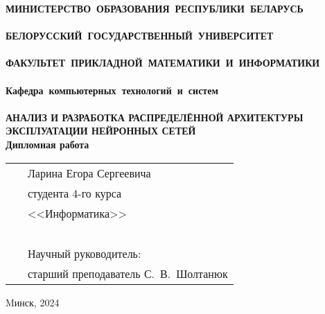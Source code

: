 \setcounter{page}{1}
\thispagestyle{empty}
\begin{center}
\bf
\vspace{4cm}
{
\mbox{МИНИСТЕРСТВО~ОБРАЗОВАНИЯ~РЕСПУБЛИКИ~БЕЛАРУСЬ} \\~\\
\mbox{БЕЛОРУССКИЙ~ГОСУДАРСТВЕННЫЙ~УНИВЕРСИТЕТ} \\~\\
\mbox{ФАКУЛЬТЕТ~ПРИКЛАДНОЙ~МАТЕМАТИКИ~И~ИНФОРМАТИКИ} \\~\\
\mbox{Кафедра~компьютерных~технологий~и~систем} \\~\\
}
\vspace{4cm}
\bf
АНАЛИЗ И РАЗРАБОТКА РАСПРЕДЕЛЁННОЙ АРХИТЕКТУРЫ ЭКСПЛУАТАЦИИ НЕЙРОННЫХ СЕТЕЙ\\
\vspace{1cm}
\rm Дипломная работа
\vspace{3cm}
\end{center}
\begin{tabular}{ll}
\hspace{10.5cm}
&Ларина Егора Сергеевича~\\
&студента 4-го курса\\
&<<Информатика>>\\~\\
&Научный руководитель:\\
&старший преподаватель С.~В.~Шолтанюк
\end{tabular}
\vspace{4cm}
\begin{center}
Mинск, 2024
\end{center}
\clearpage
\restoregeometry